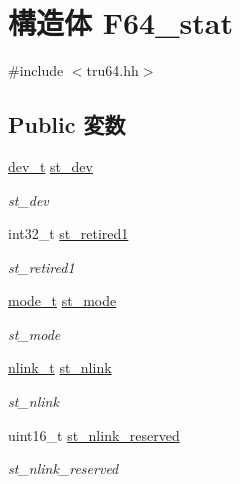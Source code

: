 \hypertarget{structTru64__F64_1_1F64__stat}{
\section{構造体 F64\_\-stat}
\label{structTru64__F64_1_1F64__stat}
}


{\ttfamily \#include $<$tru64.hh$>$}\subsection*{Public 変数}
\begin{DoxyCompactItemize}
\item 
\hyperlink{classTru64_abf62b93d918a43f0c5ee0ab777b1c3ef}{dev\_\-t} \hyperlink{structTru64__F64_1_1F64__stat_a38914c334b6acaa9e0e94c9d28d590e6}{st\_\-dev}
\begin{DoxyCompactList}\small\item\em st\_\-dev \item\end{DoxyCompactList}\item 
int32\_\-t \hyperlink{structTru64__F64_1_1F64__stat_a222b8cdb7ccd0d3408704a3cf59ff25f}{st\_\-retired1}
\begin{DoxyCompactList}\small\item\em st\_\-retired1 \item\end{DoxyCompactList}\item 
\hyperlink{classTru64_af8f4385bb42836d1e3ad4fea9d71d1b9}{mode\_\-t} \hyperlink{structTru64__F64_1_1F64__stat_aee5b542fc82f176aad79ec67feb729c8}{st\_\-mode}
\begin{DoxyCompactList}\small\item\em st\_\-mode \item\end{DoxyCompactList}\item 
\hyperlink{classTru64_a772a435921844488d52ef4df39b3e702}{nlink\_\-t} \hyperlink{structTru64__F64_1_1F64__stat_aaf71fe94712c34e733e71a11933d2794}{st\_\-nlink}
\begin{DoxyCompactList}\small\item\em st\_\-nlink \item\end{DoxyCompactList}\item 
uint16\_\-t \hyperlink{structTru64__F64_1_1F64__stat_ab0c27b218278c0f3b5721b5d8cb8a7b9}{st\_\-nlink\_\-reserved}
\begin{DoxyCompactList}\small\item\em st\_\-nlink\_\-reserved \item\end{DoxyCompactList}\item 

\end{DoxyCompactItemize}
